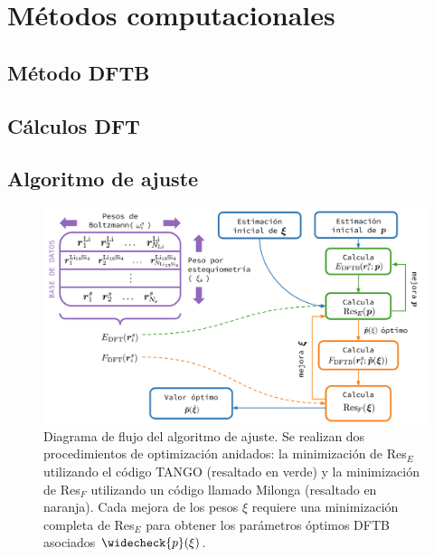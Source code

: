 \section{Métodos computacionales}

\subsection{Método DFTB}



\subsection{Cálculos DFT}


\subsection{Algoritmo de ajuste}

\begin{figure}[h!]
    \centering
    \includegraphics[width=\textwidth]{Silicio/modelo/metodos/diagrama.png}
    \caption{Diagrama de flujo del algoritmo de ajuste. Se realizan dos 
    procedimientos de optimización anidados: la minimización de Res$_E$ utilizando 
    el código TANGO \cite{tango} (resaltado en verde) y la minimización de Res$_F$
    utilizando un código llamado Milonga (resaltado en naranja). Cada mejora de 
    los pesos $\xi$ requiere una minimización completa de Res$_E$ para obtener 
    los parámetros óptimos DFTB asociados $\widecheck{p}(\xi)$.}
    \label{fig:diagrama}
\end{figure}
